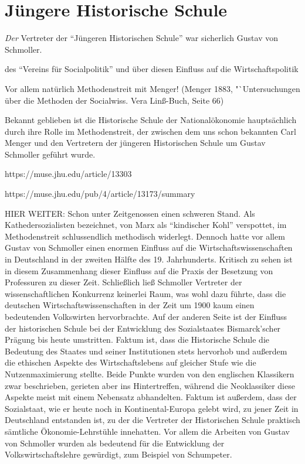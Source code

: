 \section{Jüngere Historische Schule}



\textit{Der} Vertreter der "`Jüngeren Historischen Schule"' war sicherlich Gustav von Schmoller. 








des "`Vereins für Socialpolitik"' und über diesen Einfluss auf die Wirtschaftspolitik

Vor allem natürlich Methodenstreit mit Menger! (Menger 1883, "`Untersuchungen über die Methoden der Socialwiss. Vera Linß-Buch, Seite 66)

Bekannt geblieben ist die Historische Schule der Nationalökonomie hauptsächlich durch ihre Rolle im Methodenstreit, der zwischen dem uns schon bekannten Carl Menger und den Vertretern der jüngeren Historischen Schule um Gustav Schmoller geführt wurde.

https://muse.jhu.edu/article/13303


https://muse.jhu.edu/pub/4/article/13173/summary





HIER WEITER:
Schon unter Zeitgenossen einen schweren Stand. Als Kathedersozialisten bezeichnet, von Marx als "`kindischer Kohl"' verspottet, im Methodenstreit schlussendlich methodisch widerlegt. Dennoch hatte vor allem Gustav von Schmoller einen enormen Einfluss auf die Wirtschaftswissenschaften in Deutschland in der zweiten Hälfte des 19. Jahrhunderts. Kritisch zu sehen ist in diesem Zusammenhang dieser Einfluss auf die Praxis der Besetzung von Professuren zu dieser Zeit. Schließlich ließ Schmoller Vertreter der wissenschaftlichen Konkurrenz keinerlei Raum, was wohl dazu führte, dass die deutschen Wirtschaftswissenschaften  in der Zeit um 1900 kaum einen bedeutenden Volkswirten hervorbrachte. Auf der anderen Seite ist der Einfluss der historischen Schule bei der Entwicklung des Sozialstaates Bismarck'scher Prägung bis heute umstritten. Faktum ist, dass die Historische Schule die Bedeutung des Staates und seiner Institutionen stets hervorhob und außerdem die ethischen Aspekte des Wirtschaftslebens auf gleicher Stufe wie die Nutzenmaximierung stellte. Beide Punkte wurden von den englischen Klassikern zwar beschrieben, gerieten aber ins Hintertreffen, während die Neoklassiker diese Aspekte meist mit einem Nebensatz abhandelten. Faktum ist außerdem, dass der Sozialstaat, wie er heute noch in Kontinental-Europa gelebt wird, zu jener Zeit in Deutschland entstanden ist, zu der die Vertreter der Historischen Schule praktisch sämtliche Ökonomie-Lehrstühle innehatten. Vor allem die Arbeiten von Gustav von Schmoller wurden als bedeutend für die Entwicklung der Volkswirtschaftslehre gewürdigt, zum Beispiel von Schumpeter.


